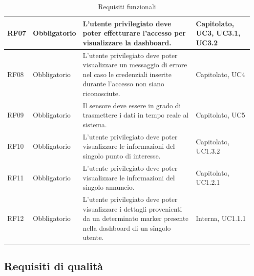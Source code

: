 \documentclass[11pt]{article}
\begin{document}
\begin{justify}
\begin{table}[H]
\begin{tabular}{|>{\centering\arraybackslash}m{2.7cm}|>{\centering\arraybackslash}m{2.7cm}|>{\centering\arraybackslash}m{6cm}|>{\centering\arraybackslash}m{2.1cm}|}
\hline
RF07 & Obbligatorio & L'utente privilegiato deve poter effetturare l'accesso per visualizzare la dashboard. & Capitolato, UC3, UC3.1, UC3.2\\
\hline
RF08 & Obbligatorio & L'utente privilegiato deve poter visualizzare un messaggio di errore nel caso le credenziali inserite durante l'accesso non siano riconosciute. & Capitolato, UC4\\
\hline
RF09 & Obbligatorio & Il sensore deve essere in grado di trasmettere i dati in tempo reale al sistema. & Capitolato, UC5\\
\hline
RF10 & Obbligatorio & L'utente privilegiato deve poter visualizzare le informazioni del singolo punto di interesse. & Capitolato, UC1.3.2\\
\hline
RF11 & Obbligatorio & L'utente privilegiato deve poter visualizzare le informazioni del singolo annuncio. & Capitolato, UC1.2.1\\
\hline
RF12 & Obbligatorio & L'utente privilegiato deve poter visualizzare i dettagli provenienti da un determinato marker presente nella dashboard di un singolo utente. & Interna, UC1.1.1\\
\hline
\end{tabular}
\caption{Requisiti funzionali}
\end{table}

\newpage
\subsection{Requisiti di qualità}


\end{justify}
\end{document}
